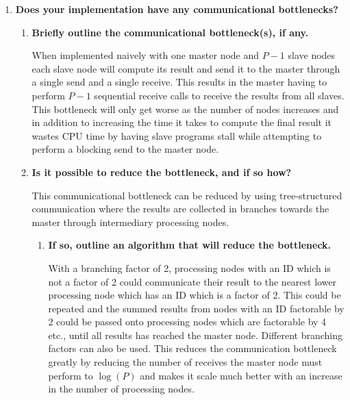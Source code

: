 \begin{enumerate}

\item \textbf{Does your implementation have any communicational bottlenecks?}

\begin{enumerate}

\item \textbf{Briefly outline the communicational bottleneck(s), if any.}

When implemented naively with one master node and $P-1$ slave nodes each slave node will compute its result and send it to the master through a single send and a single receive. This results in the master having to perform $P-1$ sequential receive calls to receive the results from all slaves. This bottleneck will only get worse as the number of nodes increases and in addition to increasing the time it takes to compute the final result it wastes CPU time by having slave programs stall while attempting to perform a blocking send to the master node.

\item \textbf{Is it possible to reduce the bottleneck, and if so how?}

This communicational bottleneck can be reduced by using tree-structured communication where the results are collected in branches towards the master through intermediary processing nodes. 

\begin{enumerate}

\item \textbf{If so, outline an algorithm that will reduce the bottleneck.}

With a branching factor of 2, processing nodes with an ID which is not a factor of 2 could communicate their result to the nearest lower processing node which has an ID which is a factor of 2. This could be repeated and the summed results from nodes with an ID factorable by 2 could be passed onto processing nodes which are factorable by 4 etc., until all results has reached the master node. Different branching factors can also be used. This reduces the communication bottleneck greatly by reducing the number of receives the master node must perform to $\log(P)$ and makes it scale much better with an increase in the number of processing nodes.

%
%


\end{enumerate}
\end{enumerate}
\end{enumerate}
